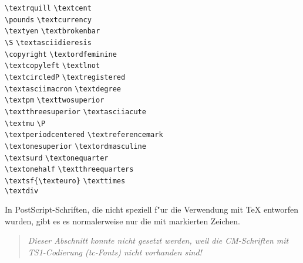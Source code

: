 {\begin{tabbing}
\textrquill \> \verb+\textrquill+ \> \textcent \> \verb+\textcent+\footnotemark[1] \\
\textsterling \> \verb+\pounds+\footnotemark[1]  \> \textcurrency \> \verb+\textcurrency+\footnotemark[1] \\
\textyen \> \verb+\textyen+\footnotemark[1] \> \textbrokenbar \> \verb+\textbrokenbar+\footnotemark[1] \\
\textsection \> \verb+\S+\footnotemark[1]  \> \textasciidieresis \> \verb+\textasciidieresis+\footnotemark[1] \\
\textcopyright \> \verb+\copyright+\footnotemark[1] \> \textordfeminine \> \verb+\textordfeminine+\footnotemark[1] \\
\textcopyleft \> \verb+\textcopyleft+ \> \textlnot \> \verb+\textlnot+\footnotemark[1] \\
\textcircledP \> \verb+\textcircledP+ \> \textregistered \> \verb+\textregistered+\footnotemark[1] \\
\textasciimacron \> \verb+\textasciimacron+\footnotemark[1]  \> \textdegree \> \verb+\textdegree+\footnotemark[1] \\
\textpm \> \verb+\textpm+\footnotemark[1] \> \texttwosuperior \> \verb+\texttwosuperior+\\
\textthreesuperior \> \verb+\textthreesuperior+ \> \textasciiacute \> \verb+\textasciiacute+\footnotemark[1] \\
\textmu \> \verb+\textmu+\footnotemark[1] \> \textparagraph \> \verb+\P+\footnotemark[1] \\
\textperiodcentered \> \verb+\textperiodcentered+\footnotemark[1] \> \textreferencemark \> \verb+\textreferencemark+\\
\textonesuperior \> \verb+\textonesuperior+ \> \textordmasculine \> \verb+\textordmasculine+\footnotemark[1] \\
\textsurd \> \verb+\textsurd+ \> \textonequarter \> \verb+\textonequarter+\\
\textonehalf \> \verb+\textonehalf+ \> \textthreequarters \> \verb+\textthreequarters+\\
\textsf{\texteuro} \> \verb+\textsf{\texteuro}+ \> \texttimes \> \verb+\texttimes+\footnotemark[1] \\
\textdiv \> \verb+\textdiv+\footnotemark[1] \\
\end{tabbing}
}

{\footnotesize\noindent 
In PostScript-Schriften, die nicht speziell f"ur die Verwendung mit
\TeX{} entworfen wurden,  gibt es es normalerweise nur die mit 
\footnotemark[1]  markierten Zeichen.
\par}

\endgroup

\else
\par\vfill
\begin{quote}
\large\sffamily\slshape
Dieser Abschnitt konnte nicht gesetzt werden, weil die
CM-Schriften mit TS1-Codierung (tc-Fonts) nicht vorhanden sind!
\end{quote}

\vfill
\clearpage
\fi

\endinput
